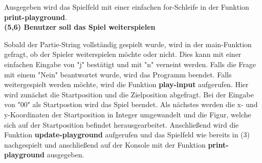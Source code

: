 Ausgegeben wird das Spielfeld mit einer einfachen for-Schleife in der Funktion \textbf{print-playground}.\\

\textbf{(5,6) Benutzer soll das Spiel weiterspielen}

Sobald der Partie-String vollständig gespielt wurde, wird in der main-Funktion gefragt, ob der Spieler weiterspielen möchte oder nicht. Dies kann mit einer einfachen Eingabe von "j" bestätigt und mit "n" verneint werden. Falls die Frage mit einem "Nein" beantwortet wurde, wird das Programm beendet. Falls weitergespielt werden möchte, wird die Funktion \textbf{play-input} aufgerufen.
Hier wird zunächst die Startposition und die Zielposition abgefragt. Bei der Eingabe von "00" als Startpostion wird das Spiel beendet.
Als nächstes werden die x- und y-Koordinaten der Startposition in Integer umgewandelt und die Figur, welche sich auf der Startposition befindet herausgearbeitet. Anschließend wird die Funktion \textbf{update-playground} aufgerufen und das Spielfeld wie bereits in (3) nachgespielt und anschließend auf der Konsole mit der Funktion \textbf{print-playground} ausgegeben.


